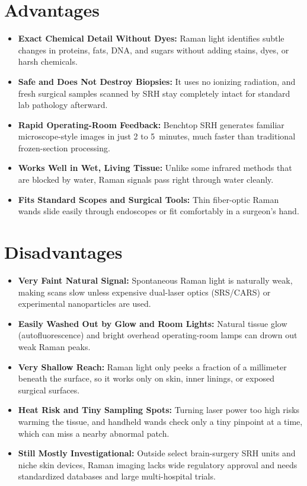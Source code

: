 \section{Advantages}
\begin{itemize}
  \item \textbf{Exact Chemical Detail Without Dyes:} Raman light identifies subtle changes in proteins, fats, DNA, and sugars without adding stains, dyes, or harsh chemicals.
  \item \textbf{Safe and Does Not Destroy Biopsies:} It uses no ionizing radiation, and fresh surgical samples scanned by SRH stay completely intact for standard lab pathology afterward.
  \item \textbf{Rapid Operating-Room Feedback:} Benchtop SRH generates familiar microscope-style images in just 2 to 5~minutes, much faster than traditional frozen-section processing.
  \item \textbf{Works Well in Wet, Living Tissue:} Unlike some infrared methods that are blocked by water, Raman signals pass right through water cleanly.
  \item \textbf{Fits Standard Scopes and Surgical Tools:} Thin fiber-optic Raman wands slide easily through endoscopes or fit comfortably in a surgeon's hand.
\end{itemize}

\section{Disadvantages}
\begin{itemize}
  \item \textbf{Very Faint Natural Signal:} Spontaneous Raman light is naturally weak, making scans slow unless expensive dual-laser optics (SRS/CARS) or experimental nanoparticles are used.
  \item \textbf{Easily Washed Out by Glow and Room Lights:} Natural tissue glow (autofluorescence) and bright overhead operating-room lamps can drown out weak Raman peaks.
  \item \textbf{Very Shallow Reach:} Raman light only peeks a fraction of a millimeter beneath the surface, so it works only on skin, inner linings, or exposed surgical surfaces.
  \item \textbf{Heat Risk and Tiny Sampling Spots:} Turning laser power too high risks warming the tissue, and handheld wands check only a tiny pinpoint at a time, which can miss a nearby abnormal patch.
  \item \textbf{Still Mostly Investigational:} Outside select brain-surgery SRH units and niche skin devices, Raman imaging lacks wide regulatory approval and needs standardized databases and large multi-hospital trials.
\end{itemize}

